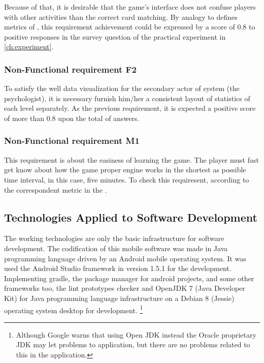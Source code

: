 \begin{table}[h!]
Because of that, it is desirable that the game's interface does not confuse players with other activities than the correct card matching. By analogy to defines metrics of \cite{ISO9126a}, this requirement achievement could be expressed by a score of 0.8 to positive responses in the survey question of the practical experiment in \ref{ch:experiment}. 

\subsubsection{Non-Functional requirement F2}

To satisfy the well data visualization for the secondary actor of system (the psychologist), it is necessary furnish him/her a consistent layout of statistics of each level separately. As the previous requirement, it is expected a positive score of more than 0.8 upon the total of answers.

\subsubsection{Non-Functional requirement M1}

This requirement is about the easiness of learning the game. The player must fast get know about how the game proper engine works in the shortest as possible time interval, in this case, five minutes. To check this requiresent, according to the correspondent metric in the \cite{ISO9126a}.

		\end{table}



\subsection{Technologies Applied to Software Development}
		
The working technologies are only the basic infrastructure for software development. The codification of this mobile software was made in Java programming language driven by an Android mobile operating system. It was used the Android Studio framework in version 1.5.1 for the development. Implementing gradle, the package manager for android projects, and some other frameworks too, the lint prototypes checker and OpenJDK 7 (Java Developer Kit) for Java programming language infrastructure on a Debian 8 (Jessie) operating system desktop for development. \footnote{Although Google warns that using Open JDK instead the Oracle proprietary JDK may let problems to application, but there are no problems related to this in the application.} 
		
